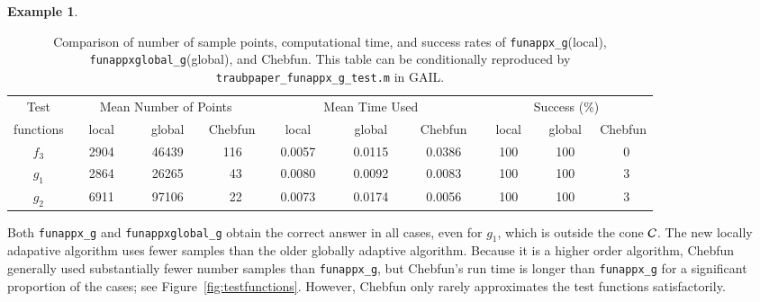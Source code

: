 \documentclass[review]{elsarticle}
\theoremstyle{definition}
\newtheorem{exmp}{Example}
\newcommand{\funappxg}{\texttt{funappx\_g}\xspace}
\newcommand{\funappxglobalg}{\texttt{funappxglobal\_g}\xspace}
\begin{document}
\begin{exmp}
%
\begin{table}[bt]
\centering
\caption{Comparison of number of sample points, computational time,  and success
rates of \funappxg (local), \funappxglobalg (global), and Chebfun.
This table can be conditionally reproduced by
\texttt{traubpaper\_funappx\_g\_test.m} in GAIL.}
\label{tab:localVsGlobalVsChebfun}
{\footnotesize
\setlength{\tabcolsep}{.3em} %
		\begin{tabular}{ccrccrccrccrccrccrccrccrccrc}		
			Test      &    \multicolumn{9}{c}{Mean Number of Points}   & \multicolumn{9}{c}{Mean Time Used}  & \multicolumn{9}{c}{Success (\%)}
			\\  functions &  \multicolumn{3}{c}{local}  &  \multicolumn{3}{c}{global }  &  \multicolumn{3}{c}{Chebfun }  & \multicolumn{3}{c}{local}  &  \multicolumn{3}{c}{global }  &  \multicolumn{3}{c}{Chebfun } & \multicolumn{3}{c}{local}  &  \multicolumn{3}{c}{global }  &  \multicolumn{3}{c}{Chebfun }
\\ \toprule
          $f_3$   &&   2904  &&&   46439   &&&   116    &&&   0.0057   &&&     0.0115    &&&   0.0386 &&&    100   &&&  100   &&&  0
\\        $g_1$   &&   2864  &&&   26265   &&&    43    &&&   0.0080   &&&     0.0092    &&&   0.0083 &&&    100   &&&  100   &&&  3
\\        $g_2$   &&   6911  &&&   97106   &&&    22    &&&   0.0073   &&&     0.0174    &&&   0.0056 &&&    100   &&&  100    &&&  3  	
\end{tabular}
}
\end{table}
%

Both \funappxg{} and \funappxglobalg{} obtain the correct answer in all cases,
even for $g_1$, which is outside the cone $\mathcal{C}$. The new locally adapative
algorithm uses fewer samples than the older globally adaptive algorithm. Because it is a higher order algorithm, Chebfun generally used substantially fewer number samples than
\funappxg, but Chebfun's run time is longer than \funappxg for a
significant proportion of the cases; see Figure~\ref{fig:testfunctions}. However, Chebfun only rarely
approximates the test functions satisfactorily.



\end{exmp}
\end{document}
